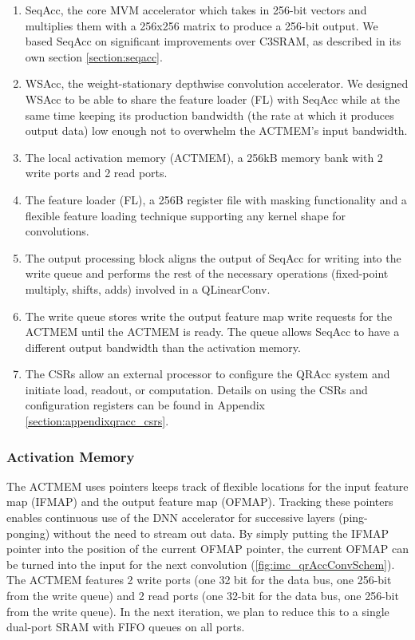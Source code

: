 \begin{enumerate}
    \item SeqAcc, the core MVM accelerator which takes in 256-bit vectors and multiplies them with a 256x256 matrix to produce a 256-bit output. We based SeqAcc on significant improvements over C3SRAM, as described in its own section \ref{section:seqacc}.
    \item WSAcc, the weight-stationary depthwise convolution accelerator. We designed WSAcc to be able to share the feature loader (FL) with SeqAcc while at the same time keeping its production bandwidth (the rate at which it produces output data) low enough not to overwhelm the ACTMEM's input bandwidth. 
    \item The local activation memory (ACTMEM), a 256kB memory bank with 2 write ports and 2 read ports. 
    \item The feature loader (FL), a 256B register file with masking functionality and a flexible feature loading technique supporting any kernel shape for convolutions.  
    \item The output processing block aligns the output of SeqAcc for writing into the write queue and performs the rest of the necessary operations (fixed-point multiply, shifts, adds) involved in a QLinearConv.
    \item The write queue stores write the output feature map write requests for the ACTMEM until the ACTMEM is ready. The queue allows SeqAcc to have a different output bandwidth than the activation memory.
    \item The CSRs allow an external processor to configure the QRAcc system and initiate load, readout, or computation. Details on using the CSRs and configuration registers can be found in Appendix \ref{section:appendixqracc_csrs}.
\end{enumerate}

\subsubsection{Activation Memory}

The ACTMEM uses pointers keeps track of flexible locations for the input feature map (IFMAP) and the output feature map (OFMAP). Tracking these pointers enables continuous use of the DNN accelerator for successive layers (ping-ponging) without the need to stream out data. By simply putting the IFMAP pointer into the position of the current OFMAP pointer, the current OFMAP can be turned into the input for the next convolution (\ref{fig:imc_qrAccConvSchem}). The ACTMEM features 2 write ports (one 32 bit for the data bus, one 256-bit from the write queue) and 2 read ports (one 32-bit for the data bus, one 256-bit from the write queue). In the next iteration, we plan to reduce this to a single dual-port SRAM with FIFO queues on all ports.

